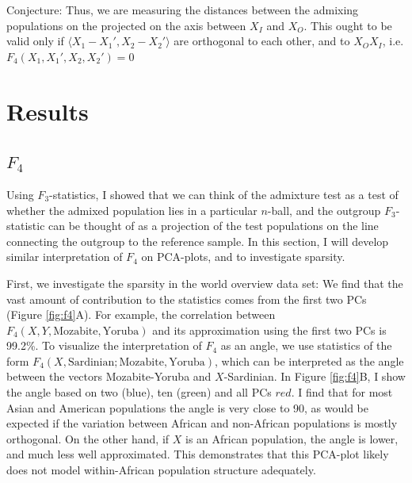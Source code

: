 \documentclass[12pt,a4pape, fullpage]{article}
\begin{document}
Conjecture: Thus, we are measuring the distances between the admixing populations on the projected on the axis between $X_I$ and $X_O$. This ought to be valid only if $\langle X_1 - X_1', X_2 - X_2' \rangle$ are orthogonal to each other, and to $X_OX_I$, i.e.
$F_4(X_1, X_1', X_2, X_2') = 0$
 
	
\section{Results}
\subsection{$F_4$}
Using $F_3$-statistics, I showed that we can think of the admixture test as a test of whether the admixed population lies in a particular $n$-ball, and the outgroup $F_3$-statistic can be thought of as a projection of the test populations on the line connecting the outgroup to the reference sample. In this section, I will develop similar interpretation of $F_4$ on PCA-plots, and to investigate sparsity. 

First, we investigate the sparsity in the world overview data set: We find that the vast amount of contribution to the statistics comes from the first two PCs (Figure \ref{fig:f4}A). For example, the correlation between $F_4(X, Y, \text{Mozabite}, \text{Yoruba})$ and its approximation using the first two PCs is 99.2\%. To visualize the interpretation of $F_4$ as an angle, we use statistics of the form $F_4(X, \text{Sardinian}; \text{Mozabite}, \text{Yoruba})$, which can be interpreted as the angle between the vectors Mozabite-Yoruba and $X$-Sardinian. In Figure \ref{fig:f4}B, I show the angle based on two (blue), ten (green) and all PCs $red$. I find that for most Asian and American populations the angle is very close to 90\textdegree, as would be expected if the variation between African and non-African populations is mostly orthogonal. On the other hand, if $X$ is an African population, the angle is lower, and much less well approximated. This demonstrates that this PCA-plot likely does not model within-African population structure adequately. 
\end{document}
